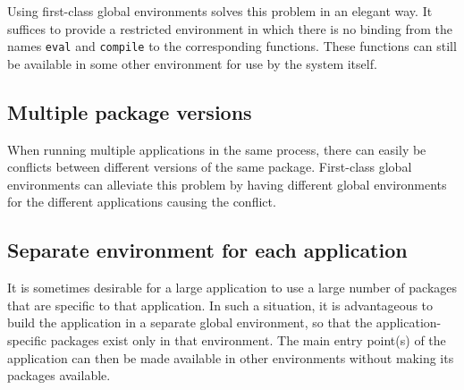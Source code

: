 Using first-class global environments solves this problem in an
elegant way.  It suffices to provide a restricted environment in which
there is no binding from the names \texttt{eval} and \texttt{compile}
to the corresponding functions.  These functions can still be
available in some other environment for use by the system itself.

\subsection{Multiple package versions}

When running multiple applications in the same \commonlisp{} process,
there can easily be conflicts between different versions of the same
package.  First-class global environments can alleviate this problem
by having different global environments for the different applications
causing the conflict.%

\subsection{Separate environment for each application}

It is sometimes desirable for a large application to use a large
number of packages that are specific to that application.  In such a
situation, it is advantageous to build the application in a separate
global environment, so that the application-specific packages exist
only in that environment.  The main entry point(s) of the application
can then be made available in other environments without making its
packages available.%

